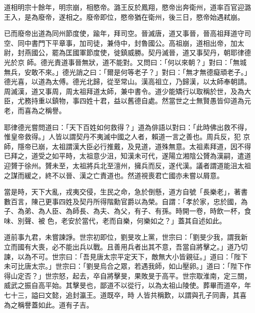 \begin{pinyinscope}
 道相明宗十餘年，明宗崩，相愍帝。潞王反於鳳翔，愍帝出奔衛州，道率百官迎潞王入，是為廢帝，遂相之。廢帝即位，愍帝猶在衛州，後三日，愍帝始遇弒崩。



 已而廢帝出道為同州節度使，踰年，拜司空。晉滅唐，道又事晉，晉高祖拜道守司空、同中書門下平章事，加司徒，兼侍中，封魯國公。高祖崩，道相出帝，加太尉，封燕國公，罷為匡國軍節度使，徙鎮威勝。契丹滅晉，道又事契丹，朝耶律德光於京
 師。德光責道事晉無狀，道不能對。又問曰：「何以來朝？」對曰：「無城無兵，安敢不來。」德光誚之曰：「爾是何等老子？」對曰：「無才無德癡頑老子。」德光喜，以道為太傅。德光北歸，從至常山。漢高祖立，乃歸漢，以太師奉朝請。周滅漢，道又事周，周太祖拜道太師，兼中書令。道少能矯行以取稱於世，及為大臣，尤務持重以鎮物，事四姓十君，益以舊德自處。然當世之士無賢愚皆仰道為元老，而喜為之稱譽。



 耶律德光嘗問道曰：「天下百姓如何救得？」道為俳語以對曰：「此時佛出救不得，惟皇帝救得。」人皆以謂契丹不夷滅中國之人者，賴道一言之善也。周兵反，犯
 京師，隱帝已崩，太祖謂漢大臣必行推戴，及見道，道殊無意。太祖素拜道，因不得已拜之，道受之如平時，太祖意少沮，知漢未可代，遂陽立湘陰公贇為漢嗣，遣道迎贇于徐州。贇未至，太祖將兵北至澶州，擁兵而反，遂代漢。議者謂道能沮太祖之謀而緩之，終不以晉、漢之亡責道也。然道視喪君亡國亦未嘗以屑意。



 當是時，天下大亂，戎夷交侵，生民之命，急於倒懸，道方自號「長樂老」，著書數百言，陳己更事四姓及契丹所得階勳官爵以為榮。自謂：「孝於家，忠於國，為子、為弟、為人臣、為師長、為夫、為父，有子、有孫。時開一卷，時飲一杯，食味、別聲、被
 色，老安於當代，老而自樂，何樂如之？」蓋其自述如此。



 道前事九君，未嘗諫諍。世宗初即位，劉旻攻上黨，世宗曰：「劉旻少我，謂我新立而國有大喪，必不能出兵以戰。且善用兵者出其不意，吾當自將擊之。」道乃切諫，以為不可。世宗曰：「吾見唐太宗平定天下，敵無大小皆親征。」道曰：「陛下未可比唐太宗。」世宗曰：「劉旻烏合之眾，若遇我師，如山壓卵。」道曰：「陛下作得山定否？」世宗怒，起去，卒自將擊旻，果敗旻于高平。世宗取淮南，定三關，威武之振自高平始。其擊旻也，鄙道不以從行，以為太祖山陵使。葬畢而道卒，年七十三，謚曰文懿，追封瀛王。道既卒，時
 人皆共稱歎，以謂與孔子同壽，其喜為之稱譽蓋如此。道有子吉。




\end{pinyinscope}
